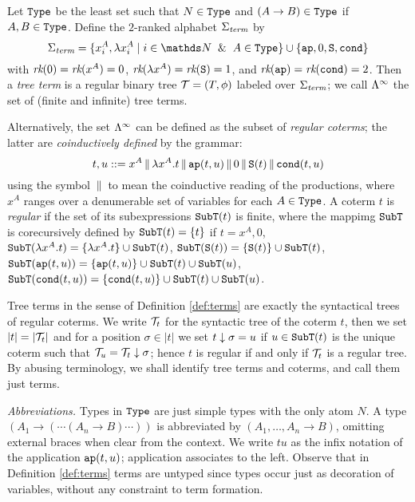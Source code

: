 \begin{definition}\label{def:terms}
Let ${\tt Type}$ be the least
set such that $N \in {\tt Type}$ and $(A \to B) \in {\tt Type}$ if $A,B \in {\tt Type}$.
Define the $2$-ranked alphabet $\Sigma_{\textit{term}}$ by
\[\SigmaTerm = \set{x_i^A, \lambda x_i^A \mid i \in \nat \And A\in \Type} \cup \set{\ap, 0, \Succ, \cond}\]
with $\textit{rk}(0) = \textit{rk}(x^A) = 0$, $\textit{rk}( \lambda x^A) = \textit{rk}({\tt S}) = 1$, and
$\textit{rk}({\tt ap}) = \textit{rk}({\tt cond}) = 2$.
Then a {\em tree term} is a regular binary tree ${\cal T} = (T, \phi)$ labeled over $\Sigma_{\textit{term}}$; we
call $\Lambda^\infty$ the set of (finite and infinite) tree terms.
\end{definition}

\medskip

Alternatively, the set $\Lambda^\infty$ can be defined as the subset of {\em regular coterms}; the latter are
{\em coinductively defined} by the grammar:
\[ t, u ::= x^A \,\|\, \lambda x^A.t \,\|\, {\tt ap}(t,u) \,\|\, 0 \,\|\, {\tt S} (t) \,\|\, {\tt cond}(t, u) \]
using the symbol $\,\|\,$ to mean the coinductive reading of the productions,
where $x^A$ ranges over a denumerable set of variables for each $A \in {\tt Type}$.
A coterm $t$ is {\em regular} if the set of its subexpressions ${\tt SubT}(t)$ is finite,
where the mappimg ${\tt SubT}$ is corecursively defined by ${\tt SubT}(t) = \{ t \}$ if $t = x^A, 0$, 
${\tt SubT}(\lambda x^A.t) = \{ \lambda x^A.t \} \cup {\tt SubT}(t)$, 
${\tt SubT}({\tt S}(t)) = \{ {\tt S}(t) \} \cup {\tt SubT}(t)$,
${\tt SubT}({\tt ap}(t,u)) = \{ {\tt ap}(t,u) \} \cup {\tt SubT}(t) \cup {\tt SubT}(u)$,
${\tt SubT}({\tt cond}(t,u)) = \{ {\tt cond}(t,u) \} \cup {\tt SubT}(t) \cup {\tt SubT}(u)$.

Tree terms in the sense of Definition \ref{def:terms} are exactly the syntactical trees of regular coterms. 
We write ${\cal T}_t$ for the syntactic tree of the coterm $t$, then we set $|t| = |{\cal T}_t|$ and for
a position $\sigma \in |t|$ we set $t \downarrow \sigma = u$ if $u \in {\tt SubT}(t)$ is the unique 
coterm such that ${\cal T}_u = {\cal T}_t \downarrow \sigma$; hence $t$ is regular if and only if ${\cal T}_t$
is a regular tree. By abusing terminology, we shall 
identify tree terms and coterms, and call them just terms.

\medskip
{\em Abbreviations.} Types in ${\tt Type}$ are just simple types with the only atom $N$.
A type $(A_1 \to (\cdots (A_n \to B) \cdots))$ is abbreviated by $(A_1, \ldots, A_n \to B)$,
omitting external braces when clear from the context.
We write $tu$ as the infix notation of the application ${\tt ap}(t,u)$; application associates to the left.
Observe that in Definition \ref{def:terms} terms are untyped since types occur just as decoration of variables, without any constraint
to term formation.

